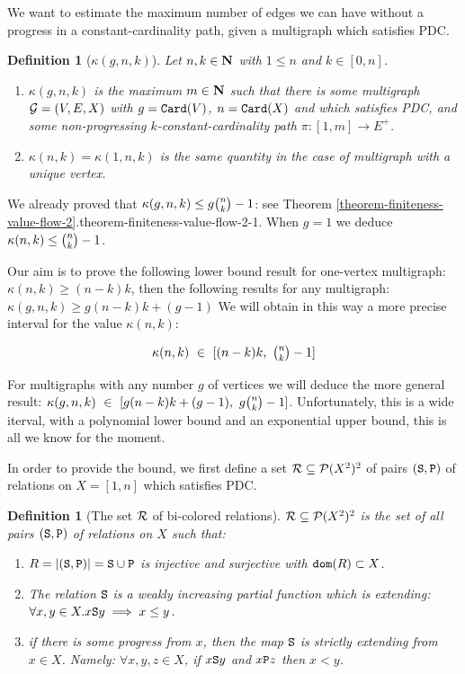 \documentclass{lmcs}
\newtheorem{definition}[theorem]{Definition}
\begin{document}
We want to estimate the maximum number of edges
we can have without a progress in a constant-cardinality path, given a multigraph 
which satisfies PDC. 

\begin{definition}[$\kappa(g,n,k)$]
Let $n,k \in {\bf N}$ with $1 \le n$ and $k \in [0,n]$.

\begin{enumerate}
\item
$\kappa(g,n,k)$ is the maximum $m \in {\bf N}$ such that there is
some multigraph ${\mathcal G}=(V,E,X)$ with $g = {\tt Card}(V)$, $n={\tt Card}(X)$
and which satisfies PDC,
and some non-progressing $k$-constant-cardinality path $\pi:[1,m] \rightarrow E^+$.

\item
$\kappa(n,k) = \kappa(1,n,k)$ is the same quantity in the case of multigraph 
with a unique vertex.
\end{enumerate}
\end{definition}

We already proved that $\kappa(g,n,k) \le g  \newton{n}{k}-1$:
see Theorem 
\ref{theorem-finiteness-value-flow-2}.{theorem-finiteness-value-flow-2-1}.
When $g=1$ we deduce $\kappa(n,k) \le \newton{n}{k}-1$. 

Our aim is to prove the following lower bound result
for one-vertex multigraph: $\kappa(n,k) \ge (n-k)k$, then
the following results for any multigraph: $\kappa(g,n,k) \ge g(n-k)k + (g-1)$
We will obtain in this way a more precise interval for the value $\kappa(n,k)$:

$$
\kappa(n,k) \ \in \ [ (n-k)k,  \ \newton{n}{k}-1 ]
$$

For multigraphs with any number $g$ of vertices we will deduce the more general result:
$\kappa(g,n,k) \ \in \ [ g(n-k)k+(g-1),  \ g  \newton{n}{k}-1 ]$.
Unfortunately, this is a wide iterval, with a polynomial lower bound and an exponential 
upper bound, this is all we know for the moment.

In order to provide the bound, we first define a
set ${\mathcal R} \subseteq {\mathcal P}(X^2)^2$ of pairs $({\tt S},{\tt P})$ of relations on $X = [1,n]$
which satisfies PDC.

\begin{definition}[The set ${\mathcal R}$ of bi-colored relations]
${\mathcal R} \subseteq {\mathcal P}(X^2)^2$ is the set of all pairs $({\tt S},{\tt P})$ 
of relations on $X$ such that:
\begin{enumerate}
\item
$R = {| ({\tt S},{\tt P}) |} = {\tt S} \cup {\tt P}$ is injective and surjective
with ${\tt dom}(R) \subset X$.

\item
The relation ${\tt S}$ is a weakly increasing partial function which is extending:
$\forall x,y \in X. x {\tt S} y \implies x \le y$. 

\item
if there is some progress from $x$, then the map ${\tt S}$ is strictly extending from $x \in X$.
Namely: $\forall x,y,z \in X$, if $x {\tt S} y$ and $x {\tt P} z$ then $x < y$.
\end{enumerate}
\end{definition}
\end{document}
